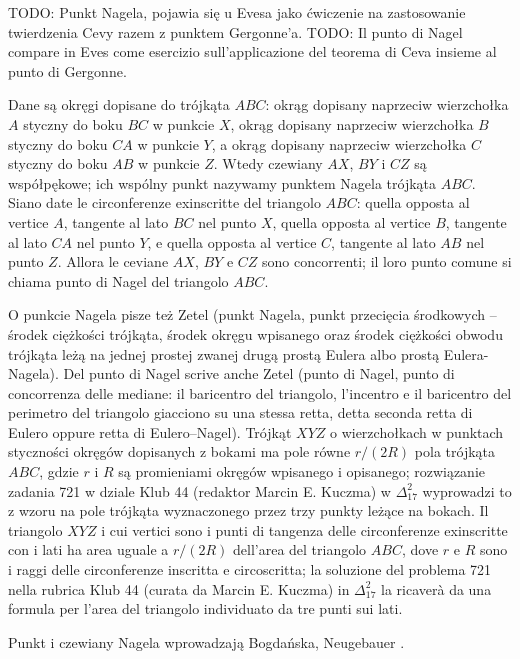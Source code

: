 
%

TODO: Punkt Nagela, pojawia się u Evesa \cite[s. 71]{eves1_1972} jako ćwiczenie na zastosowanie twierdzenia Cevy razem z punktem Gergonne'a. %
TODO: Il punto di Nagel compare in Eves \cite[p. 71]{eves1_1972} come esercizio sull'applicazione del teorema di Ceva insieme al punto di Gergonne. %

\begin{proposition}
[punkt Nagela] %
[punto di Nagel] %
    \label{punkt_nagela}
    Dane są okręgi dopisane do trójkąta $ABC$: okrąg dopisany naprzeciw wierzchołka $A$ styczny do boku $BC$ w punkcie $X$, okrąg dopisany naprzeciw wierzchołka $B$ styczny do boku $CA$ w punkcie $Y$, a okrąg dopisany naprzeciw wierzchołka $C$ styczny do boku $AB$ w punkcie $Z$. %
    Wtedy czewiany $AX$, $BY$ i $CZ$ są współpękowe; ich wspólny punkt nazywamy punktem Nagela trójkąta $ABC$. %
    Siano date le circonferenze exinscritte del triangolo $ABC$: quella opposta al vertice $A$, tangente al lato $BC$ nel punto $X$, quella opposta al vertice $B$, tangente al lato $CA$ nel punto $Y$, e quella opposta al vertice $C$, tangente al lato $AB$ nel punto $Z$. %
    Allora le ceviane $AX$, $BY$ e $CZ$ sono concorrenti; il loro punto comune si chiama punto di Nagel del triangolo $ABC$. %
\end{proposition}

O punkcie Nagela pisze też Zetel \cite[s. 22, 25, 64]{zetel_2020} (punkt Nagela, punkt przecięcia środkowych -- środek ciężkości trójkąta, środek okręgu wpisanego oraz środek ciężkości obwodu trójkąta leżą na jednej prostej zwanej drugą prostą Eulera albo prostą Eulera-Nagela). %
Del punto di Nagel scrive anche Zetel \cite[p. 22, 25, 64]{zetel_2020} (punto di Nagel, punto di concorrenza delle mediane: il baricentro del triangolo, l'incentro e il baricentro del perimetro del triangolo giacciono su una stessa retta, detta seconda retta di Eulero oppure retta di Eulero--Nagel). %
Trójkąt $XYZ$ o wierzchołkach w punktach styczności okręgów dopisanych z bokami ma pole równe $r/(2R)$ pola trójkąta $ABC$, gdzie $r$ i $R$ są promieniami okręgów wpisanego i opisanego; rozwiązanie zadania 721 w dziale Klub 44 (redaktor Marcin E. Kuczma) w $\Delta_{17}^{2}$ wyprowadzi to z wzoru na pole trójkąta wyznaczonego przez trzy punkty leżące na bokach. %
Il triangolo $XYZ$ i cui vertici sono i punti di tangenza delle circonferenze exinscritte con i lati ha area uguale a $r/(2R)$ dell'area del triangolo $ABC$, dove $r$ e $R$ sono i raggi delle circonferenze inscritta e circoscritta; la soluzione del problema 721 nella rubrica Klub 44 (curata da Marcin E. Kuczma) in $\Delta_{17}^{2}$ la ricaverà da una formula per l'area del triangolo individuato da tre punti sui lati. %

Punkt i czewiany Nagela wprowadzają Bogdańska, Neugebauer \cite[s. 120]{neugebauer_2018}.

%